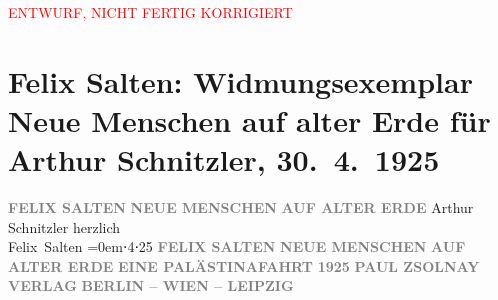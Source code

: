 
\begin{center}
            \textcolor{red}{ENTWURF, NICHT FERTIG KORRIGIERT}
                      \end{center}
            
         \renewcommand{\erwaehnteInstitutionen}{Institutionen: Paul Zsolnay Verlag}
         \renewcommand{\erwaehnteOrte}{Orte: Berlin, Leipzig, Wien}
         \renewcommand{\erwaehnteWerke}{}
               \section[Felix Salten: Widmungsexemplar Neue Menschen auf alter Erde für Arthur Schnitzler, 30. 4. 1925]{ Felix Salten: Widmungsexemplar Neue Menschen auf alter Erde für Arthur
               Schnitzler, 30. 4. 1925}\nopagebreak{}\rehead{ }\begin{ledgroupsized}[t]{13cm}\normalsize\beginnumbering \toendnotes[C]{\smallbreak\pagebreak[2]} 
\pstart
           \noindent{}\centering{}{\pb}\textcolor{gray}{\textbf{FELIX SALTEN}}\pend
           \pstart
           \noindent{}\centering{}\textcolor{gray}{\textbf{NEUE MENSCHEN}}\pend
           \pstart
           \noindent{}\centering{}\textcolor{gray}{\textbf{AUF ALTER ERDE}}\pend
           {\bigskip}\pstart
           \noindent{}Arthur Schnitzler\pend
           \pstart
           herzlich{\\[\baselineskip]}\spacefill\mbox{Felix Salten}\pend
           \leftskip=0em{}⋅4⋅25\pend
           {\bigskip}\pstart
           \noindent{}\centering{}{\pb}\textcolor{gray}{\textbf{FELIX SALTEN}}\pend
           \pstart
           \noindent{}\centering{}\textcolor{gray}{\textbf{NEUE MENSCHEN}}\pend
           \pstart
           \noindent{}\centering{}\textcolor{gray}{\textbf{AUF ALTER ERDE}}\pend
           {\bigskip}\pstart
           \noindent{}\centering{}\textcolor{gray}{\textbf{EINE PALÄSTINAFAHRT}}\pend
           {\bigskip}\pstart
           \noindent{}\centering{}\textcolor{gray}{\textbf{1925}}\pend
           \pstart
           \noindent{}\centering{}\textcolor{gray}{\textbf{PAUL ZSOLNAY VERLAG}}\pend
           \pstart
           \noindent{}\centering{}\textcolor{gray}{\textbf{BERLIN – WIEN – LEIPZIG}}\pend
           
         
         \endnumbering{}\end{ledgroupsized}\begin{anhang}\end{anhang}\newcommand{\dateiname}{L03045}\newcommand{\titel}{Felix Salten: Widmungsexemplar Neue Menschen auf alter Erde für Arthur Schnitzler, 30. 4. 1925}\newcommand{\editorInnen}{Martin Anton Müller und Laura Untner}
      